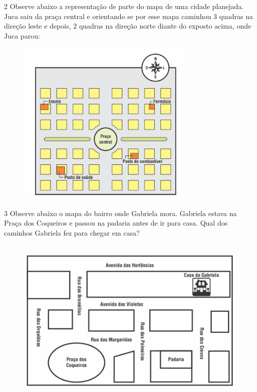 
\num{2}  Observe abaixo a representação de parte do mapa de uma cidade
planejada. Juca saiu da praça central e orientando se por esse mapa caminhou $3$
quadras na direção leste e depois, $2$ quadras na direção norte diante do
exposto acima, onde Juca parou:

\begin{figure}
\includegraphics[width=3.39535in,height=3.14326in]{./imgSAEB_6_MAT/media/image65.png}
\end{figure}


\num{3}  Observe abaixo o mapa do bairro onde Gabriela mora. Gabriela estava na Praça dos Coqueiros e passou na padaria antes de ir
para casa. Qual dos caminhos Gabriela fez para chegar em casa?

\begin{figure}
\includegraphics[width=4.95347in,height=3.13958in]{./imgSAEB_6_MAT/media/image66.png}
\end{figure}

